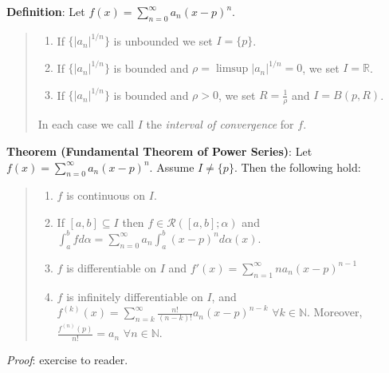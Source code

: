 \documentclass[11pt]{article}
\begin{document}
\textbf{Definition}: Let $f(x) = \sum_{n=0}^\infty a_n (x-p)^n$.
\begin{quote}\vspace{-0.3cm}
	\begin{enumerate}
	\item If $\{|a_n|^{1/n}\}$ is unbounded we set $I = \{p\}$.
	\item If $\{|a_n|^{1/n}\}$ is bounded and $\rho = \limsup |a_n|^{1/n} = 0$, we set $I = \mathbb{R}$.
	\item If $\{|a_n|^{1/n}\}$ is bounded and $\rho > 0$, we set $R = \frac{1}{\rho}$ and $I = B(p, R)$.
	\end{enumerate}
	In each case we call $I$ the \emph{interval of convergence} for $f$.
\end{quote}

\textbf{Theorem (Fundamental Theorem of Power Series)}: Let $f(x) = \sum_{n=0}^\infty a_n (x-p)^n$. Assume $I \neq \{p\}$. Then the following hold:
\begin{quote}\vspace{-0.3cm}
	\begin{enumerate}
	\item $f$ is continuous on $I$.
	\item If $[a,b] \subseteq I$ then $f \in \mathcal{R}([a,b]; \alpha)$ and $\int_a^b f d\alpha = \sum_{n=0}^\infty a_n \int_a^b (x-p)^n d\alpha(x)$.
	\item $f$ is differentiable on $I$ and $f'(x) = \sum_{n=1}^\infty n a_n (x-p)^{n-1}$
	\item $f$ is infinitely differentiable on $I$, and $f^{(k)}(x) = \sum_{n=k}^\infty \frac{n!}{(n-k)!} a_n(x-p)^{n-k}$ $\forall k \in \mathbb{N}$. Moreover, $\frac{f^{(n)}(p)}{n!} = a_n$ $\forall n \in \mathbb{N}$.
	\end{enumerate}
\end{quote}

\emph{Proof}: exercise to reader.
\end{document}
